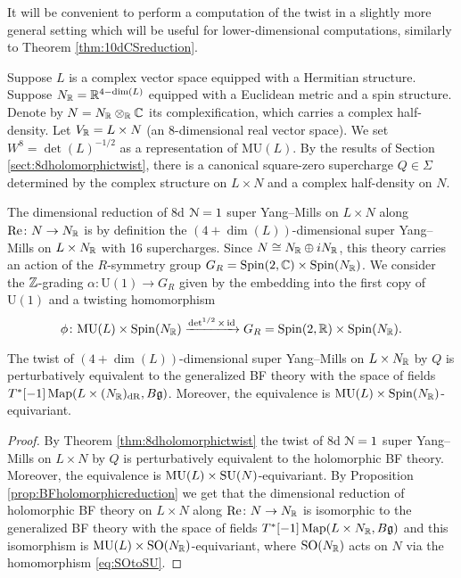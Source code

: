 \documentclass[10pt, oneside]{article}
\newcommand{\MU}{\mathrm{MU}}
\renewcommand{\Re}{\mathrm{Re}}
\renewcommand{\U}{\mathrm{U}}
\begin{document}
It will be convenient to perform a computation of the twist in a slightly more general setting which will be useful for lower-dimensional computations, similarly to Theorem \ref{thm:10dCSreduction}.

Suppose $L$ is a complex vector space equipped with a Hermitian structure. Suppose $N_\mathbb R=\mathbb R^{4-\dim(L)}$ equipped with a Euclidean metric and a spin structure. Denote by $N=N_\mathbb R\otimes_\mathbb R\mathbb C$ its complexification, which carries a complex half-density. Let $V_\mathbb R = L\times N$ (an 8-dimensional real vector space). We set $W^8=\det(L)^{-1/2}$ as a representation of $\MU(L)$. By the results of Section \ref{sect:8dholomorphictwist}, there is a canonical square-zero supercharge $Q\in\Sigma$ determined by the complex structure on $L\times N$ and a complex half-density on $N$.

The dimensional reduction of 8d $\mathcal N=1$ super Yang--Mills on $L\times N$ along $\Re\colon N\rightarrow N_\RR$ is by definition the $(4+\dim(L))$-dimensional super Yang--Mills on $L\times N_\mathbb R$ with 16 supercharges. Since $N\cong N_\mathbb R\oplus iN_\mathbb R$, this theory carries an action of the $R$-symmetry group $G_R=\mathrm{Spin}(2, \mathbb C)\times \mathrm{Spin}(N_\mathbb R)$. We consider the $\mathbb Z$-grading $\alpha\colon \U(1)\rightarrow G_R$ given by the embedding into the first copy of $\U(1)$ and a twisting homomorphism
\[\phi\colon \MU(L)\times \Spin(N_\RR)\xrightarrow{\det^{1/2}\times \id} G_R=\Spin(2, \RR)\times \Spin(N_\RR).\]

\begin{theorem}
The twist of $(4+\dim(L))$-dimensional super Yang--Mills on $L\times N_\mathbb R$ by $Q$ is perturbatively equivalent to the generalized BF theory with the space of fields $T^*[-1] \operatorname{Map}(L\times (N_\mathbb R)_{\mathrm{dR}}, B\mathfrak g)$. Moreover, the equivalence is $\MU(L)\times \Spin(N_\RR)$-equivariant.
\label{thm:8dBFreduction}
\end{theorem}
\begin{proof}
By Theorem \ref{thm:8dholomorphictwist} the twist of 8d $\mathcal N=1$ super Yang--Mills on $L\times N$ by $Q$ is perturbatively equivalent to the holomorphic BF theory. Moreover, the equivalence is $\MU(L)\times \SU(N)$-equivariant. By Proposition \ref{prop:BFholomorphicreduction} we get that the dimensional reduction of holomorphic BF theory on $L\times N$ along $\Re\colon N\rightarrow N_\RR$ is isomorphic to the generalized BF theory with the space of fields $T^*[-1]\operatorname{Map}(L\times N_\mathbb R, B\mathfrak g)$ and this isomorphism is $\MU(L)\times \SO(N_\RR)$-equivariant, where $\mathrm{SO}(N_\mathbb R)$ acts on $N$ via the homomorphism \eqref{eq:SOtoSU}.
\end{proof}
\end{document}
